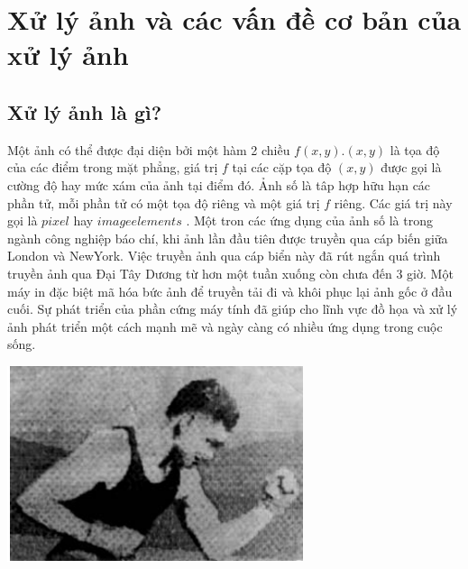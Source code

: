 \documentclass[12pt,oneside,a4]{report}
\begin{document}
%
%
\chapter{Xử lý ảnh và các vấn đề cơ bản của xử lý ảnh}
\section{Xử lý ảnh là gì?}
Một ảnh có thể được đại diện bởi một hàm 2 chiều $f(x,y)$.$(x, y)$ là tọa độ của các điểm trong mặt phẳng, giá trị $f$ tại các cặp tọa độ $(x,y)$ được gọi là cường độ  hay mức xám của ảnh tại điểm đó. Ảnh số là tâp hợp hữu hạn các  phần tử, mỗi phần tử có một tọa độ riêng và một giá trị $f$ riêng. Các giá trị này gọi là $pixel$ hay $ image elements$ . Một tron các ứng dụng của ảnh số là trong ngành công nghiệp báo chí, khi ảnh lần đầu tiên được truyền qua cáp biến giữa London và NewYork. Việc truyền ảnh qua cáp biển này đã rút ngắn quá trình truyền ảnh qua Đại Tây Dương từ hơn một tuần xuống còn chưa đến 3 giờ. Một máy in đặc biệt mã hóa bức ảnh để truyền tải đi và khôi phục lại ảnh gốc ở đầu cuối. Sự phát triển của phần cứng máy tính đã giúp cho lĩnh vực đồ họa và xử lý ảnh phát triển một cách mạnh mẽ và ngày càng có nhiều ứng dụng trong cuộc sống.
\begin{center}
\includegraphics[]{figure/1921.png}
\end{center}
\end{document}

